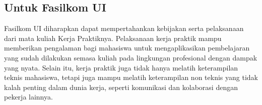 \subsection{Untuk Fasilkom UI}
\label{sec:saranFasilkom}
Fasilkom UI diharapkan dapat mempertahankan kebijakan serta pelaksanaan dari
mata kuliah Kerja Praktiknya. Pelaksanaan kerja praktik mampu memberikan
pengalaman bagi mahasiswa untuk mengaplikasikan pembelajaran yang sudah
dilakukan semasa kuliah pada lingkungan profesional dengan dampak yang nyata.
Selain itu, kerja praktik juga tidak hanya melatih keterampilan teknis
mahasiswa, tetapi juga mampu melatih keterampilan non teknis yang tidak kalah
penting dalam dunia kerja, seperti komunikasi dan kolaborasi dengan pekerja
lainnya.
